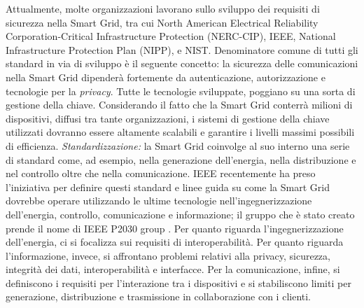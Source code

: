 Attualmente, molte organizzazioni lavorano sullo sviluppo dei requisiti di sicurezza nella Smart Grid, tra cui North American Electrical Reliability Corporation-Critical Infrastructure Protection (NERC-CIP), IEEE, National Infrastructure Protection Plan (NIPP), e NIST. \newline 
Denominatore comune di tutti gli standard in via di sviluppo è il seguente concetto: la sicurezza delle comunicazioni nella Smart Grid dipenderà fortemente da autenticazione, autorizzazione e tecnologie per la \emph{privacy}. \newline Tutte le tecnologie sviluppate, poggiano su una sorta di gestione della chiave. Considerando il fatto che la Smart Grid conterrà milioni di dispositivi, diffusi tra tante organizzazioni, i sistemi di gestione della chiave utilizzati dovranno essere altamente scalabili e garantire i livelli massimi possibili di efficienza.
\newline \newline
\textit{Standardizzazione:} la Smart Grid coinvolge al suo interno una serie di standard come, ad esempio, nella generazione dell'energia, nella distribuzione e nel controllo oltre che nella comunicazione. IEEE recentemente ha preso l'iniziativa per definire questi standard e linee guida su come la Smart Grid dovrebbe operare utilizzando le ultime tecnologie nell'ingegnerizzazione dell'energia, controllo, comunicazione e informazione; il gruppo che è stato creato prende il nome di IEEE P2030 group \cite{surveymotiv}. \newline Per quanto riguarda l'ingegnerizzazione dell'energia, ci si focalizza sui requisiti di interoperabilità. Per quanto riguarda l'informazione, invece, si affrontano problemi relativi alla privacy, sicurezza, integrità dei dati, interoperabilità e interfacce. Per la comunicazione, infine, si definiscono i requisiti per l'interazione tra i dispositivi e si stabiliscono limiti per generazione, distribuzione e trasmissione in collaborazione con i clienti.
 

